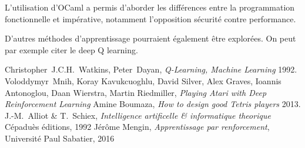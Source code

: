 \documentclass{report}
\begin{document}
L'utilisation d'OCaml a permis d'aborder les différences entre la programmation
fonctionnelle et impérative, notamment l'opposition sécurité contre performance.

D'autres méthodes d'apprentissage pourraient également être explorées. On peut
par exemple citer le deep Q learning\cite{deepmind}.

\begin{thebibliography}{9}
    Christopher~J.C.H.~Watkins, Peter~Dayan,
    \textit{Q-Learning, Machine Learning}
    1992.
    Voloddymyr~Mnih, Koray Kavukcuoghlu, David Silver, Alex Graves, Ioannis
    Antonoglou, Daan Wierstra, Martin Riedmiller,
    \textit{Playing Atari with Deep Reinforcement Learning}
    Amine Boumaza,
    \textit{How to design good Tetris players}
    2013.
    J.-M.~Alliot \& T.~Schiex,
    \textit{Intelligence artificelle \& informatique theorique}
    C\'epadu\`es \'editions, 1992
    J\'er\^ome Mengin,
    \textit{Apprentissage par renforcement},
    Université Paul Sabatier, 2016
\end{thebibliography}
\end{document}
